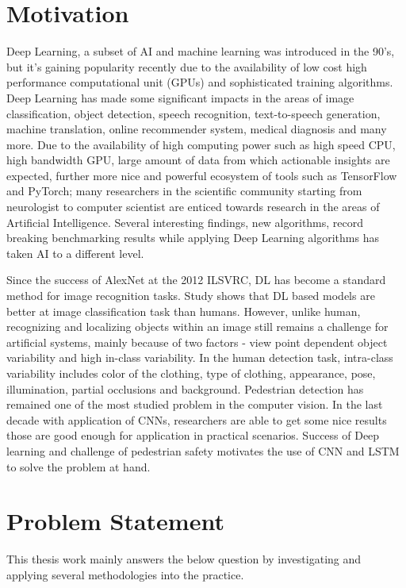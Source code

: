 \section{Motivation}
Deep Learning, a subset of AI and machine learning was introduced in the 90's, but it's gaining  popularity recently due to the availability of low cost high performance computational unit (GPUs) and sophisticated training algorithms. Deep Learning has made some significant impacts in the areas of image classification, 
object detection, speech recognition, text-to-speech generation, machine translation,
online recommender system, medical diagnosis and many more. Due to the availability of high 
computing power such as high speed CPU, high bandwidth GPU, large amount of 
data from which actionable insights are expected, further more nice and powerful ecosystem of  
tools such as TensorFlow and PyTorch; many researchers in the scientific community 
starting from neurologist to computer scientist are enticed towards research in the areas 
of Artificial Intelligence. Several interesting findings, new algorithms, record 
breaking benchmarking results while applying Deep Learning algorithms has taken 
AI to a different level. 

\newpara 

\newpara Since the success of AlexNet at the 2012 ILSVRC, DL has become a standard method for image recognition tasks. Study shows that DL based models are better at image classification task than humans. However, unlike human, recognizing and localizing objects within an image still remains a challenge for artificial 
systems, mainly because of two factors - view point dependent object variability and
high in-class variability. In the human detection task, intra-class variability includes
color of the clothing, type of clothing, appearance, pose, illumination, partial occlusions
and background. Pedestrian detection has remained one of the most studied problem in the computer vision.
In the last decade with application of CNNs, researchers are able to get some nice results 
those are good enough for application in practical scenarios. Success of Deep learning and challenge of pedestrian safety motivates the use of CNN and LSTM to solve the problem at hand.

\section{Problem Statement }
This thesis work mainly answers the below question by investigating and  applying several methodologies into the practice. 

